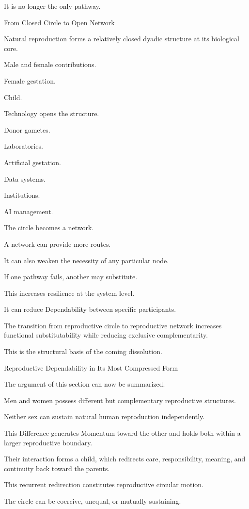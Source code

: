 It is no longer the only pathway.

From Closed Circle to Open Network

Natural reproduction forms a relatively closed dyadic structure at its biological core.

Male and female contributions.

Female gestation.

Child.

Technology opens the structure.

Donor gametes.

Laboratories.

Artificial gestation.

Data systems.

Institutions.

AI management.

The circle becomes a network.

A network can provide more routes.

It can also weaken the necessity of any particular node.

If one pathway fails, another may substitute.

This increases resilience at the system level.

It can reduce Dependability between specific participants.

The transition from reproductive circle to reproductive network increases functional substitutability while reducing exclusive complementarity.

This is the structural basis of the coming dissolution.

Reproductive Dependability in Its Most Compressed Form

The argument of this section can now be summarized.

Men and women possess different but complementary reproductive structures.

Neither sex can sustain natural human reproduction independently.

This Difference generates Momentum toward the other and holds both within a larger reproductive boundary.

Their interaction forms a child, which redirects care, responsibility, meaning, and continuity back toward the parents.

This recurrent redirection constitutes reproductive circular motion.

The circle can be coercive, unequal, or mutually sustaining.

